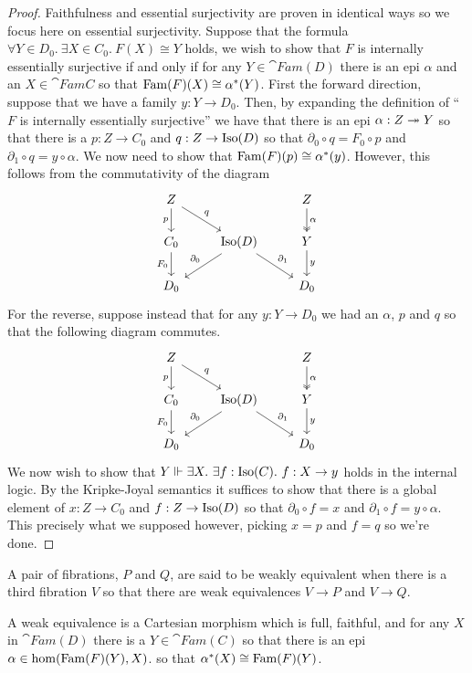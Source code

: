\begin{proof}
  Faithfulness and essential surjectivity are proven in identical ways
  so we focus here on essential surjectivity. Suppose that the formula
  $\forall Y \in D_0.\ \exists X \in C_0.\ F(X) \cong Y$ holds, we
  wish to show that $F$ is internally essentially surjective if and
  only if for any $Y \in \cat{Fam}(D)$ there is an epi $\alpha$ and an
  $X \in \cat{Fam}{C}$ so that $\operatorname{Fam}(F)(X) \cong \alpha^*(Y)$.
  First the forward direction, suppose that we have a family
  $y : Y \to D_0$. Then, by expanding the definition of ``$F$ is
  internally essentially surjective'' we have that there is an epi
  $\alpha : Z \twoheadrightarrow Y$ so that there is a $p : Z \to C_0$ and
  $q : Z \to \operatorname{Iso}(D)$ so that $\partial_0 \circ q = F_0 \circ p$ and
  $\partial_1 \circ q = y \circ \alpha$. We now need to show that
  $\operatorname{Fam}(F)(p) \cong \alpha^*(y)$. However, this follows from the
  commutativity of the diagram
  \[
    \begin{tikzcd}
      Z \ar[d, swap, "p"] \ar[dr, "q"] && Z \ar[d, twoheadrightarrow, "\alpha"]\\
      C_0 \ar[d, swap, "F_0"] & \isos(D) \ar[dl, swap, "\partial_0"] \ar[dr, "\partial_1"] & Y \ar[d, "y"]\\
      D_0 && D_0
    \end{tikzcd}
  \]
  For the reverse, suppose instead that for any $y : Y \to D_0$ we had
  an $\alpha$, $p$ and $q$ so that the following diagram commutes.
  \[
    \begin{tikzcd}
      Z \ar[d, swap, "p"] \ar[dr, "q"] && Z \ar[d, twoheadrightarrow, "\alpha"]\\
      C_0 \ar[d, swap, "F_0"] & \isos(D) \ar[dl, swap, "\partial_0"] \ar[dr, "\partial_1"] & Y \ar[d, "y"]\\
      D_0 && D_0
    \end{tikzcd}
  \]
  We now wish to show that
  $Y \Vdash \exists X.\ \exists f : \operatorname{Iso}(C).\ f : X \to y$ holds in
  the internal logic. By the Kripke-Joyal semantics it suffices to
  show that there is a global element of $x : Z \to C_0$ and
  $f : Z \to \operatorname{Iso}(D)$ so that $\partial_0 \circ f = x$ and
  $\partial_1 \circ f = y \circ \alpha$. This precisely what we
  supposed however, picking $x = p$ and $f = q$ so we're done.
\end{proof}
\begin{defn}\label{defn:complete:weakequivalencefib}
  A pair of fibrations, $P$ and $Q$, are said to be weakly equivalent
  when there is a third fibration $V$ so that there are weak
  equivalences $V \to P$ and $V \to Q$.

  A weak equivalence is a Cartesian morphism which is full, faithful,
  and for any $X$ in $\cat{Fam}(D)$ there is a $Y \in \cat{Fam}(C)$ so
  that there is an epi $\alpha \in \hom(\operatorname{Fam}(F)(Y), X)$. so that
  $\alpha^*(X) \cong \operatorname{Fam}(F)(Y)$.
\end{defn}

